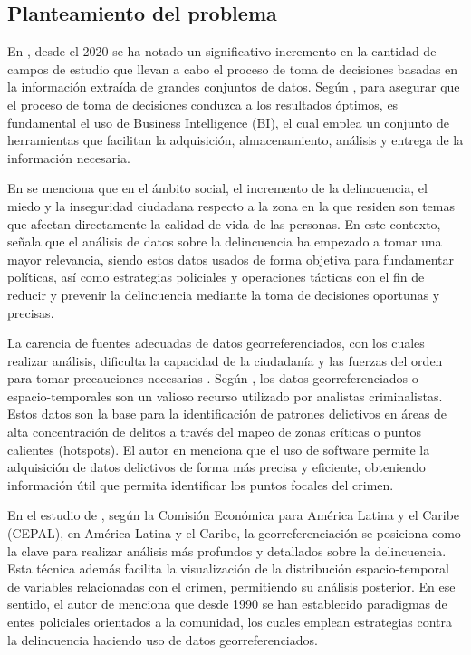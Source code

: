 \subsection{Planteamiento del problema}
En \cite{rummensMobilePhoneData2021}, desde el 2020 se ha notado un significativo incremento en la cantidad de
campos de estudio que llevan a cabo el proceso de toma de decisiones basadas en la información extraída de grandes
conjuntos de datos. Según \cite{ahishakiyePerformanceAnalysisBusiness}, para asegurar que el proceso de toma
de decisiones conduzca a los resultados óptimos, es fundamental el uso de Business Intelligence (BI), el cual
emplea un conjunto de herramientas que facilitan la adquisición, almacenamiento, análisis y entrega de la información
necesaria.

\bigbreak
En \cite{reidDevelopingModelPerceptions2020} se menciona que en el ámbito social, el incremento de la delincuencia,
el miedo y la inseguridad ciudadana respecto a la zona en la que residen son temas que afectan directamente la calidad
de vida de las personas. En este contexto, \cite{rummensMobilePhoneData2021} señala que el análisis de datos sobre la
delincuencia ha empezado a tomar una mayor relevancia, siendo estos datos usados de forma objetiva para fundamentar
políticas, así como estrategias policiales y operaciones tácticas con el fin de reducir y prevenir la delincuencia
mediante la toma de decisiones oportunas y precisas.

\bigbreak
La carencia de fuentes adecuadas de datos georreferenciados, con los cuales realizar análisis, dificulta la capacidad de
la ciudadanía y las fuerzas del orden para tomar precauciones necesarias \cite{tasnimNovelMultiModuleApproach2022}. Según
\cite{vieiraCrimePredictionPrevention2022}, los datos georreferenciados o espacio-temporales son un valioso recurso utilizado
por analistas criminalistas. Estos datos son la base para la identificación de patrones delictivos en áreas de alta concentración
de delitos a través del mapeo de zonas críticas o puntos calientes (hotspots). El autor en \cite{rummensMobilePhoneData2021}
menciona que el uso de software permite la adquisición de datos delictivos de forma más precisa y eficiente, obteniendo información
útil que permita identificar los puntos focales del crimen.

\bigbreak
En el estudio de \cite{unitednationsReferenceFrameworkSecurity2022}, según la Comisión Económica para América Latina y el Caribe (CEPAL),
en América Latina y el Caribe, la georreferenciación se posiciona como la clave para realizar análisis más profundos y detallados sobre la
delincuencia. Esta técnica además facilita la visualización de la distribución espacio-temporal de variables relacionadas con el crimen,
permitiendo su análisis posterior. En ese sentido, el autor de \cite{ariasCrimePunishmentLatin2023} menciona que desde 1990 se han establecido
paradigmas de entes policiales orientados a la comunidad, los cuales emplean estrategias contra la delincuencia haciendo uso de datos
georreferenciados.

